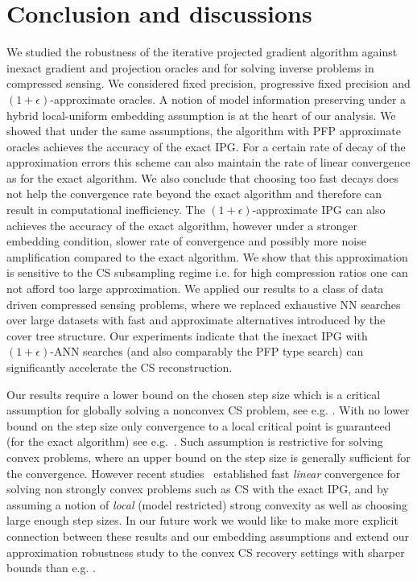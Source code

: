 \section{Conclusion and discussions}\label{sec:conclusion}
We studied the robustness of the iterative projected gradient  algorithm against inexact gradient and projection oracles and for solving inverse problems in compressed sensing. We considered fixed precision, progressive fixed precision and $(1+\epsilon)$-approximate oracles. A notion of model information preserving under a hybrid local-uniform embedding assumption is at the heart of our analysis. We showed that under the same assumptions, the algorithm with PFP approximate oracles achieves 
 the accuracy of the exact IPG.
For a certain rate of decay of the  approximation errors this scheme  can also maintain the  rate of linear convergence as for the exact algorithm. We  also conclude that choosing too fast decays does not help the convergence rate beyond the exact algorithm and therefore  can result in computational inefficiency. 
The $(1+\epsilon)$-approximate IPG can also achieves  
the accuracy of the exact algorithm, however
under a stronger embedding condition, slower rate of convergence and possibly more noise amplification  compared to the exact algorithm. We show that this approximation is sensitive to the CS subsampling regime i.e. for high compression ratios one can not afford too large approximation. 
We applied our results to a class of data driven compressed sensing problems, where we replaced exhaustive NN searches over large datasets with fast and approximate alternatives introduced by the cover tree structure. Our experiments indicate that the inexact IPG with  $(1+\epsilon)$-ANN searches (and also comparably the PFP type search) can significantly accelerate the CS reconstruction.  

Our results require a lower bound on the chosen step size which is a critical assumption for globally solving a nonconvex CS problem, see e.g. \cite{IHTCS,Blumen,AIHT}. With no lower bound on the step size only convergence to a local critical point is guaranteed (for the exact algorithm) see e.g.~\cite{Nesterov:nonconvex,Attouch}. Such assumption is restrictive for solving convex problems, where an upper bound on the step size is generally sufficient for the convergence. However recent studies~\cite{negahban:fast,Gabriel:FBlocal,Oymak:tradeoff} established fast \emph{linear} convergence for solving non strongly convex problems such as CS with the exact IPG, and by assuming a notion of \emph{local} (model restricted) strong convexity as well as choosing large enough step sizes. In our future work  
we would like to make more explicit connection between these results and our embedding assumptions and extend our approximation robustness study to the convex CS recovery settings with sharper bounds than e.g. \cite{BachinexactIPG}.


